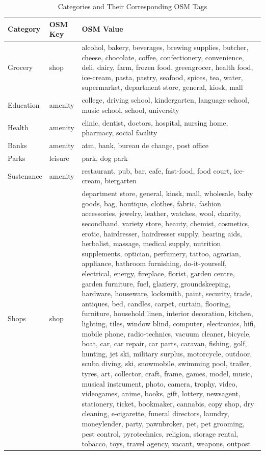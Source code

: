\begin{table}[ht]
\centering
\caption{Categories and Their Corresponding OSM Tags}
\label{tab:categories}
\footnotesize
\begin{tabular}{|l|l|p{10cm}|}
\hline
\textbf{Category} & \textbf{OSM Key} & \textbf{OSM Value} \\ \hline
Grocery           & shop             & alcohol, bakery, beverages, brewing supplies, butcher, cheese, chocolate, coffee, confectionery, convenience, deli, dairy, farm, frozen food, greengrocer, health food, ice-cream, pasta, pastry, seafood, spices, tea, water, supermarket, department store, general, kiosk, mall \\ \hline
Education         & amenity          & college, driving school, kindergarten, language school, music school, school, university \\ \hline
Health            & amenity          & clinic, dentist, doctors, hospital, nursing home, pharmacy, social facility \\ \hline
Banks             & amenity          & atm, bank, bureau de change, post office \\ \hline
Parks             & leisure          & park, dog park \\ \hline
Sustenance        & amenity          & restaurant, pub, bar, cafe, fast-food, food court, ice-cream, biergarten \\ \hline
Shops             & shop             & department store, general, kiosk, mall, wholesale, baby goods, bag, boutique, clothes, fabric, fashion accessories, jewelry, leather, watches, wool, charity, secondhand, variety store, beauty, chemist, cosmetics, erotic, hairdresser, hairdresser supply, hearing aids, herbalist, massage, medical supply, nutrition supplements, optician, perfumery, tattoo, agrarian, appliance, bathroom furnishing, do-it-yourself, electrical, energy, fireplace, florist, garden centre, garden furniture, fuel, glaziery, groundskeeping, hardware, houseware, locksmith, paint, security, trade, antiques, bed, candles, carpet, curtain, flooring, furniture, household linen, interior decoration, kitchen, lighting, tiles, window blind, computer, electronics, hifi, mobile phone, radio-technics, vacuum cleaner, bicycle, boat, car, car repair, car parts, caravan, fishing, golf, hunting, jet ski, military surplus, motorcycle, outdoor, scuba diving, ski, snowmobile, swimming pool, trailer, tyres, art, collector, craft, frame, games, model, music, musical instrument, photo, camera, trophy, video, videogames, anime, books, gift, lottery, newsagent, stationery, ticket, bookmaker, cannabis, copy shop, dry cleaning, e-cigarette, funeral directors, laundry, moneylender, party, pawnbroker, pet, pet grooming, pest control, pyrotechnics, religion, storage rental, tobacco, toys, travel agency, vacant, weapons, outpost \\ \hline
\end{tabular}
\normalsize
\end{table}

